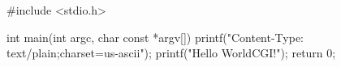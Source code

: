 #include <stdio.h>

int main(int argc, char const *argv[])
{
    printf("Content-Type: text/plain;charset=us-ascii\n\n");
    printf("Hello World\nVia CGI!\n");
    return 0;
}
